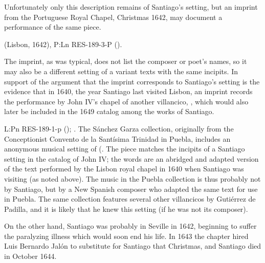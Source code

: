 Unfortunately only this description remains of Santiago's setting, but an
imprint from the Portuguese Royal Chapel, Christmas 1642, may document a
performance of the same piece.%
\begin{Footnote}
     (Lisbon, 1642), P:Ln RES-189-3-P ().
\end{Footnote}
The imprint, as was typical, does not list the composer or poet's names, so it
may also be a different setting of a variant texts with the same incipits.
In support of the argument that the imprint corresponds to Santiago's setting is
the evidence that in 1640, the year Santiago last visited Lisbon, an imprint
records the performance by John IV's chapel of another villancico, , which would also later be included in the 1649 catalog
among the works of Santiago.%
\begin{Footnote}
    L:Pn RES-189-1-p (); 
    \autocite[caixão 26, ]{JohnIV:Catalog}.  
    The Sánchez Garza collection, originally from the Conceptionist Convento de
    la Santísima Trinidad in Puebla, includes an anonymous musical setting of
     (.
    The piece matches the incipits of a Santiago setting in the catalog of John
    IV; the words are an abridged and adapted version of the text performed by
    the Lisbon royal chapel in 1640 when Santiago was visiting (as noted above).
    The music in the Puebla collection is thus probably not by Santiago, but by
    a New Spanish composer who adapted the same text for use in Puebla.
    The same collection features several other villancicos by Gutiérrez de
    Padilla, and it is likely that he knew this setting (if he was not its
    composer).
    \end{Footnote}
On the other hand, Santiago was probably in Seville in 1642, beginning to suffer
the paralyzing illness which would soon end his life.
In 1643 the chapter hired Luis Bernardo Jalón to substitute for Santiago that
Christmas, and Santiago died in October 1644.%
    \Autocite{Ezquerro:JalonLB}

